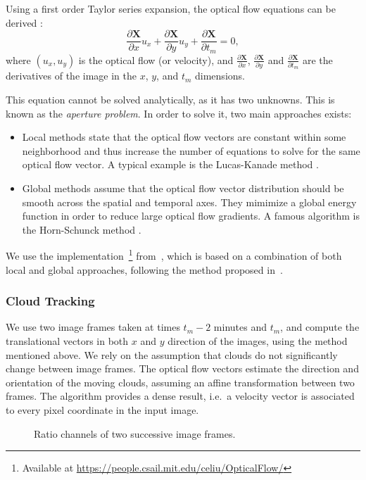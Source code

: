Using a first order Taylor series expansion, the optical flow equations can be derived \cite{fleet2006optical}:
\[\frac{\partial \mathbf{X}}{\partial x}u_x + \frac{\partial \mathbf{X}}{\partial y}u_y + \frac{\partial \mathbf{X}}{\partial t_m} = 0,\]
where $(u_x, u_y)$ is the optical flow (or velocity), and $\frac{\partial \mathbf{X}}{\partial x}$, $\frac{\partial \mathbf{X}}{\partial y}$ and $\frac{\partial \mathbf{X}}{\partial t_m}$ are the derivatives of the image in the $x$, $y$, and $t_m$ dimensions.

This equation cannot be solved analytically, as it has two unknowns. This is known as the \emph{aperture problem}. In order to solve it, two main approaches exists:

\begin{itemize}
\item Local methods state that the optical flow vectors are constant within some neighborhood and thus increase the number of equations to solve for the same optical flow vector. A typical example is the Lucas-Kanade method \cite{lucas1981iterative}.
\item Global methods assume that the optical flow vector distribution should be smooth across the spatial and temporal axes. They mimimize a global energy function in order to reduce large optical flow gradients. A famous algorithm is the Horn-Schunck method \cite{horn1981determining}.
\end{itemize}

We use the implementation~\footnote{Available at \url{https://people.csail.mit.edu/celiu/OpticalFlow/}} from~\cite{liu2009beyond}, which is based on a combination of both local and global approaches, following the method proposed in~\cite{bruhn2005lucas}.


\subsubsection{Cloud Tracking}
We use two image frames taken at times $t_m-2$ minutes and $t_m$, and compute the translational vectors in both $x$ and $y$ direction of the images, using the method mentioned above. We rely on the assumption that clouds do not significantly change between image frames. The optical flow vectors estimate the direction and orientation of the moving clouds, assuming an affine transformation between two frames. The algorithm provides a dense result, i.e.\ a velocity vector is associated to every pixel coordinate in the input image.

\begin{figure}[htb]
\centering
{}
\hspace{2mm}
\caption{Ratio channels of two successive image frames.}\label{fig:ratioimage}
\end{figure}

